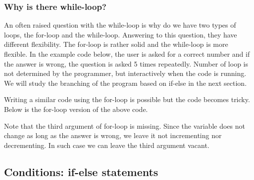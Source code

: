 \subsubsection{Why is there while-loop?}

An often raised question with the while-loop is why do we have two types of loops, 
the for-loop and the while-loop. Answering to this question, they have different
flexibility. The for-loop is rather solid and the while-loop is more flexible. In the
example code below, the user is asked for a correct number and if the answer is wrong, the
question is asked 5 times repeatedly. Number of loop is not determined by the
programmer, but interactively when the code is running. We will study
the branching of the program based on if-else in the next section.  



Writing a similar code using the for-loop is possible but the code becomes tricky.
Below is the for-loop version of the above code.  



Note that the third argument of for-loop is missing. Since the variable
 does not change as long as the answer is wrong, we leave it not
incrementing nor decrementing. In such case we can leave the third argument
vacant. 

\subsection{Conditions: if-else statements}
